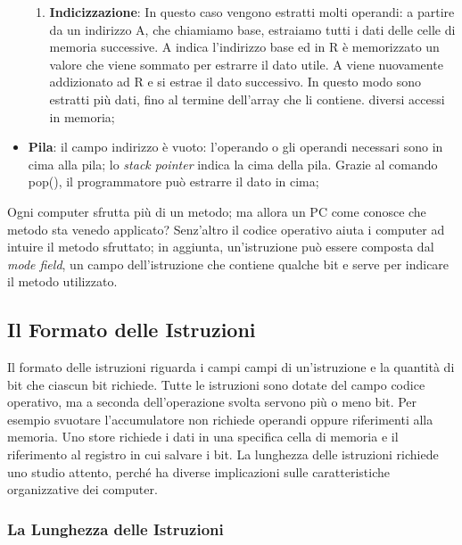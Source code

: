 \documentclass{article}
\begin{document}
\begin{itemize}
\begin{enumerate}
		\item \textbf{Indicizzazione}: In questo caso vengono estratti molti operandi: a partire da un indirizzo A, che chiamiamo base, estraiamo tutti i dati delle celle di memoria successive. A indica l'indirizzo base ed in R è memorizzato un valore che viene sommato per estrarre il dato utile. A viene nuovamente addizionato ad R e si estrae il dato successivo. In questo modo sono estratti più dati, fino al termine dell'array che li contiene. diversi accessi in memoria;

	\end{enumerate}

	\item \textbf{Pila}: il campo indirizzo è vuoto: l'operando o gli operandi necessari sono in cima alla pila; lo \textit{stack pointer} indica la cima della pila. Grazie al comando pop(), il programmatore può estrarre il dato in cima;
\end{itemize}

Ogni computer sfrutta più di un metodo; ma allora un PC come conosce che metodo sta venedo applicato? Senz'altro il codice operativo aiuta i computer ad intuire il metodo sfruttato; in aggiunta, un'istruzione può essere composta dal \textit{mode field}, un campo dell'istruzione che contiene qualche bit e serve per indicare il metodo utilizzato.

\subsection{Il Formato delle Istruzioni}

Il formato delle istruzioni riguarda i campi campi di un'istruzione e la quantità di bit che ciascun bit richiede. Tutte le istruzioni sono dotate del campo codice operativo, ma a seconda dell'operazione svolta servono più o meno bit. Per esempio svuotare l'accumulatore non richiede operandi oppure riferimenti alla memoria. Uno store richiede i dati in una specifica cella di memoria e il riferimento al registro in cui salvare i bit. La lunghezza delle istruzioni richiede uno studio attento, perché ha diverse implicazioni sulle caratteristiche organizzative dei computer.

\subsubsection{La Lunghezza delle Istruzioni}
\end{document}
